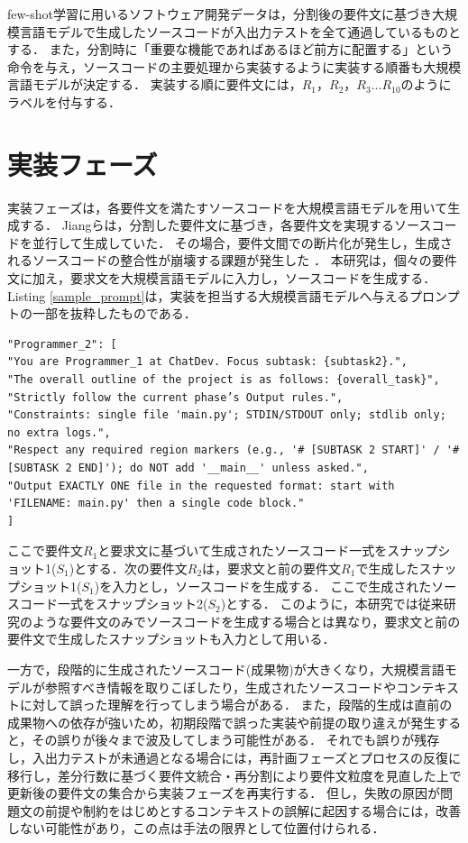 \documentclass[11pt]{jreport}
\begin{document}
few-shot学習に用いるソフトウェア開発データは，分割後の要件文に基づき大規模言語モデルで生成したソースコードが入出力テストを全て通過しているものとする．
また，分割時に「重要な機能であればあるほど前方に配置する」という命令を与え，ソースコードの主要処理から実装するように実装する順番も大規模言語モデルが決定する．
実装する順に要件文には，$R_1，R_2，R_3... R_10$のようにラベルを付与する．

\section{実装フェーズ}
実装フェーズは，各要件文を満たすソースコードを大規模言語モデルを用いて生成する．
Jiangらは，分割した要件文に基づき，各要件文を実現するソースコードを並行して生成していた．
その場合，要件文間での断片化が発生し，生成されるソースコードの整合性が崩壊する課題が発生した\cite{TOSEM} ．
本研究は，個々の要件文に加え，要求文を大規模言語モデルに入力し，ソースコードを生成する．
Listing \ref{sample_prompt}は，実装を担当する大規模言語モデルへ与えるプロンプトの一部を抜粋したものである．

\begin{lstlisting}[caption={実装を行う大規模言語モデルへ与えるプロンプト例},label={sample_prompt}]
"Programmer_2": [
"You are Programmer_1 at ChatDev. Focus subtask: {subtask2}.",
"The overall outline of the project is as follows: {overall_task}",
"Strictly follow the current phase’s Output rules.",
"Constraints: single file 'main.py'; STDIN/STDOUT only; stdlib only; no extra logs.",
"Respect any required region markers (e.g., '# [SUBTASK 2 START]' / '# [SUBTASK 2 END]'); do NOT add '__main__' unless asked.",
"Output EXACTLY ONE file in the requested format: start with 'FILENAME: main.py' then a single code block."
]
\end{lstlisting}


ここで要件文$R_1$と要求文に基づいて生成されたソースコード一式をスナップショット1($S_1$)とする．次の要件文$R_2$は，要求文と前の要件文$R_1$で生成したスナップショット1($S_1$)を入力とし，ソースコードを生成する．
ここで生成されたソースコード一式をスナップショット2($S_2$)とする．
このように，本研究では従来研究のような要件文のみでソースコードを生成する場合とは異なり，要求文と前の要件文で生成したスナップショットも入力として用いる．

一方で，段階的に生成されたソースコード(成果物)が大きくなり，大規模言語モデルが参照すべき情報を取りこぼしたり，生成されたソースコードやコンテキストに対して誤った理解を行ってしまう場合がある．
また，段階的生成は直前の成果物への依存が強いため，初期段階で誤った実装や前提の取り違えが発生すると，その誤りが後々まで波及してしまう可能性がある．
それでも誤りが残存し，入出力テストが未通過となる場合には，再計画フェーズとプロセスの反復に移行し，差分行数に基づく要件文統合・再分割により要件文粒度を見直した上で更新後の要件文の集合から実装フェーズを再実行する．
但し，失敗の原因が問題文の前提や制約をはじめとするコンテキストの誤解に起因する場合には，改善しない可能性があり，この点は手法の限界として位置付けられる．
\end{document}
